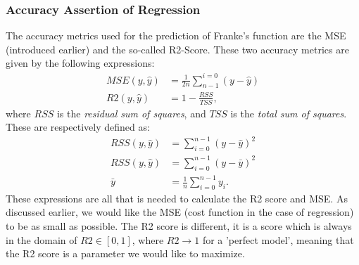         \subsubsection{Accuracy Assertion of Regression}
        	The accuracy metrics used for the prediction of Franke's function are the MSE (introduced earlier) and the so-called R2-Score. These two accuracy metrics are given by the following expressions:
        	\begin{align}
        		MSE(y, \hat{y}) &= \frac{1}{2n}\sum_{n-1}^{i=0} \left(y-\hat{y}\right)\\
        		R2(y, \hat{y}) &= 1 - \frac{RSS}{TSS},
        	\end{align}
        	where $RSS$ is the \textit{residual sum of squares}, and $TSS$ is the \textit{total sum of squares}. These are respectively defined as:
        	\begin{align}
        		RSS(y, \hat{y}) &= \sum^{n-1}_{i=0} \left(y-\hat{y}\right)^2\\
        		RSS(y, \hat{y}) &= \sum^{n-1}_{i=0} \left(y-\bar{y}\right)^2\\
        		\bar{y} &= \frac{1}{n}\sum^{n-1}_{i=0}y_i. 
        	\end{align}
        	These expressions are all that is needed to calculate the R2 score and MSE. As discussed earlier, we would like the MSE (cost function in the case of regression) to be as small as possible. The R2 score is different, it is a score which is always in the domain of $R2\in [0,1]$, where $R2\rightarrow 1$ for a 'perfect model', meaning that the R2 score is a parameter we would like to maximize.